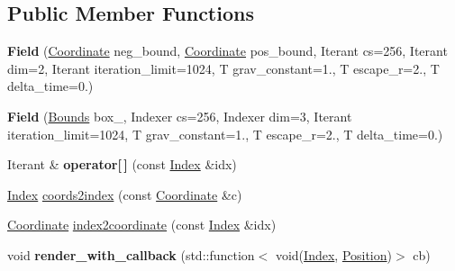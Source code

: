 \subsection*{Public Member Functions}
\begin{DoxyCompactItemize}
\item 
\mbox{\label{structmgs_1_1Field_a1faa4164faa615f55bb649251b3e344d}} 
{\bfseries Field} (\hyperlink{structmgs_1_1Vector}{Coordinate} neg\+\_\+bound, \hyperlink{structmgs_1_1Vector}{Coordinate} pos\+\_\+bound, Iterant cs=256, Iterant dim=2, Iterant iteration\+\_\+limit=1024, T grav\+\_\+constant=1., T escape\+\_\+r=2., T delta\+\_\+time=0.)
\item 
\mbox{\label{structmgs_1_1Field_ac7a2c770a1f9206aa73f949f4b312f80}} 
{\bfseries Field} (\hyperlink{structmgs_1_1Bounds}{Bounds} box\+\_\+, Indexer cs=256, Indexer dim=3, Iterant iteration\+\_\+limit=1024, T grav\+\_\+constant=1., T escape\+\_\+r=2., T delta\+\_\+time=0.)
\item 
\mbox{\label{structmgs_1_1Field_af82babd1c2f9c0e304698849f1a39ff0}} 
Iterant \& {\bfseries operator\mbox{[}$\,$\mbox{]}} (const \hyperlink{structmgs_1_1Index}{Index} \&idx)
\item 
\hyperlink{structmgs_1_1Index}{Index} \hyperlink{structmgs_1_1Field_ae10cc38826982adfbf9ef8df7b9bf5bd}{coords2index} (const \hyperlink{structmgs_1_1Vector}{Coordinate} \&c)
\item 
\hyperlink{structmgs_1_1Vector}{Coordinate} \hyperlink{structmgs_1_1Field_a28972ab1f16b45ca949849de53ecf7e7}{index2coordinate} (const \hyperlink{structmgs_1_1Index}{Index} \&idx)
\item 
\mbox{\label{structmgs_1_1Field_aa5925b0bbd068b347d69e41cce42ad0e}} 
void {\bfseries render\+\_\+with\+\_\+callback} (std\+::function$<$ void(\hyperlink{structmgs_1_1Index}{Index}, \hyperlink{structmgs_1_1Vector}{Position})$>$ cb)
\end{DoxyCompactItemize}

